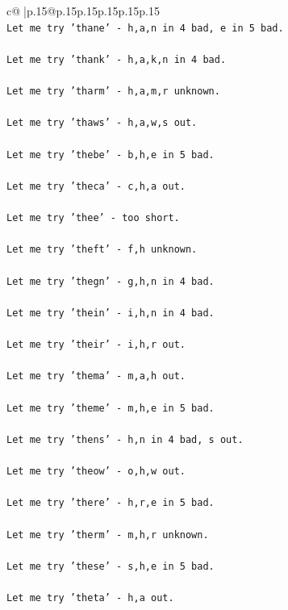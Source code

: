 \documentclass{article}
\begin{document}
{\begin{supertabular}{c@{$\;$}|p{.15\linewidth}@{}p{.15\linewidth}p{.15\linewidth}p{.15\linewidth}p{.15\linewidth}p{.15\linewidth}}
{{{\\ 
\texttt{Let me try 'thane' {-} h,a,n in 4 bad, e in 5 bad. } \\
\\ 
\texttt{Let me try 'thank' {-} h,a,k,n in 4 bad. } \\
\\ 
\texttt{Let me try 'tharm' {-} h,a,m,r unknown. } \\
\\ 
\texttt{Let me try 'thaws' {-} h,a,w,s out. } \\
\\ 
\texttt{Let me try 'thebe' {-} b,h,e in 5 bad. } \\
\\ 
\texttt{Let me try 'theca' {-} c,h,a out. } \\
\\ 
\texttt{Let me try 'thee' {-} too short. } \\
\\ 
\texttt{Let me try 'theft' {-} f,h unknown. } \\
\\ 
\texttt{Let me try 'thegn' {-} g,h,n in 4 bad. } \\
\\ 
\texttt{Let me try 'thein' {-} i,h,n in 4 bad. } \\
\\ 
\texttt{Let me try 'their' {-} i,h,r out. } \\
\\ 
\texttt{Let me try 'thema' {-} m,a,h out. } \\
\\ 
\texttt{Let me try 'theme' {-} m,h,e in 5 bad. } \\
\\ 
\texttt{Let me try 'thens' {-} h,n in 4 bad, s out. } \\
\\ 
\texttt{Let me try 'theow' {-} o,h,w out. } \\
\\ 
\texttt{Let me try 'there' {-} h,r,e in 5 bad. } \\
\\ 
\texttt{Let me try 'therm' {-} m,h,r unknown. } \\
\\ 
\texttt{Let me try 'these' {-} s,h,e in 5 bad. } \\
\\ 
\texttt{Let me try 'theta' {-} h,a out. } \\
\\ 
}}}
\end{supertabular}}
\end{document}
